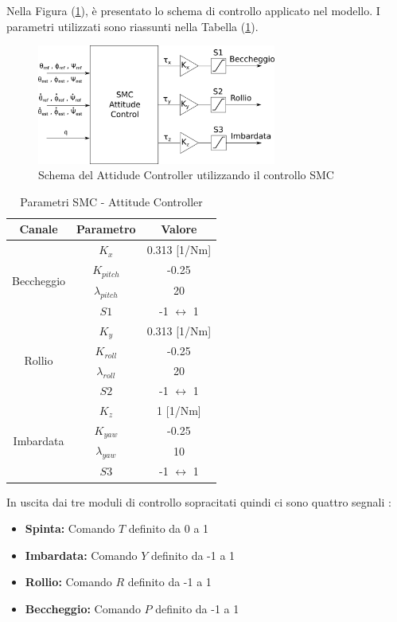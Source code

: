 Nella Figura (\ref{fig:SMC_ATT}), è presentato lo schema di controllo applicato nel modello. I parametri utilizzati sono riassunti nella Tabella (\ref{tab:ab:SMC_ATT}).

\begin{figure}
	\centering
	\includegraphics[width=0.7\textwidth]{SistemaQuadrirotore/Figure/SMCAttitudeCtrl}
	\caption{Schema del Attidude Controller utilizzando il controllo SMC}
	\label{fig:SMC_ATT}
\end{figure}

\begin{table}
	\centering
	\caption{Parametri SMC - Attitude Controller}
	\begin{tabular}{c c c}
		\hline
		Canale  & Parametro & Valore \\
		\hline
		\multirow{4}{*}{Beccheggio}&$K_x$ & 0.313 [1/Nm]\\
		&$K_{pitch}$ & -0.25\\
		&$\lambda_{pitch}$ & 20\\
		&$S1$ & -1 $\leftrightarrow$ 1\\
		\hline
		\multirow{4}{*}{Rollio}&$K_y$ & 0.313 [1/Nm]\\
		&$K_{roll}$ & -0.25\\
		&$\lambda_{roll}$ & 20\\
		&$S2$ & -1 $\leftrightarrow$ 1\\
		\hline
		\multirow{4}{*}{Imbardata}&$K_z$ & 1 [1/Nm]\\
		&$K_{yaw}$ & -0.25\\
		&$\lambda_{yaw}$ & 10\\
		&$S3$ & -1 $\leftrightarrow$ 1\\
		\hline
	\end{tabular}	
	\label{tab:ab:SMC_ATT}
\end{table}
\clearpage
In uscita dai tre moduli di controllo sopracitati quindi ci sono quattro segnali :
\begin{itemize}
	\item \textbf{Spinta:} Comando $T$ definito da 0 a 1
	\item \textbf{Imbardata:} Comando $Y$ definito da -1 a 1
	\item \textbf{Rollio:} Comando $R$ definito da -1 a 1
	\item \textbf{Beccheggio:} Comando $P$ definito da -1 a 1
\end{itemize}

